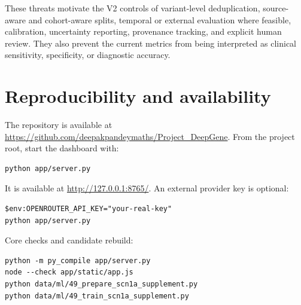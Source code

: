 \documentclass[12pt,a4paper]{article}
\begin{document}
These threats motivate the V2 controls of variant-level deduplication, source-aware and cohort-aware splits, temporal or external evaluation where feasible, calibration, uncertainty reporting, provenance tracking, and explicit human review. They also prevent the current metrics from being interpreted as clinical sensitivity, specificity, or diagnostic accuracy.

\section{Reproducibility and availability}
The repository is available at \url{https://github.com/deepakpandeymaths/Project_DeepGene}. From the project root, start the dashboard with:
\begin{lstlisting}
python app/server.py
\end{lstlisting}
It is available at \url{http://127.0.0.1:8765/}. An external provider key is optional:
\begin{lstlisting}
$env:OPENROUTER_API_KEY="your-real-key"
python app/server.py
\end{lstlisting}
Core checks and candidate rebuild:
\begin{lstlisting}
python -m py_compile app/server.py
node --check app/static/app.js
python data/ml/49_prepare_scn1a_supplement.py
python data/ml/49_train_scn1a_supplement.py
\end{lstlisting}
\end{document}
